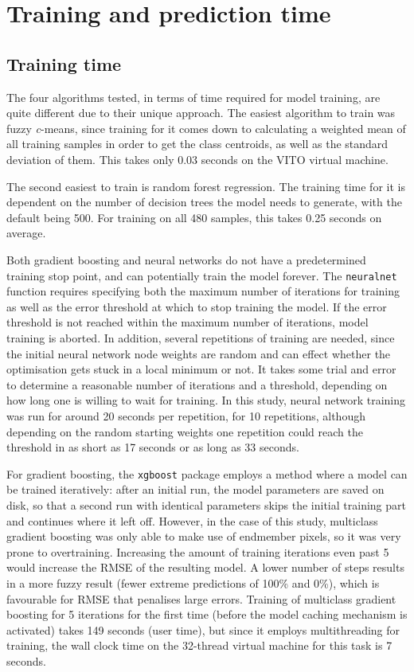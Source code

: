 \documentclass[a4paper,12pt]{scrbook}
\begin{document}
\section{Training and prediction time}

\subsection{Training time}

The four algorithms tested, in terms of time required for model training, are quite different due to their unique approach. The easiest algorithm to train was fuzzy \textit{c}-means, since training for it comes down to calculating a weighted mean of all training samples in order to get the class centroids, as well as the standard deviation of them. This takes only 0.03 seconds on the VITO virtual machine.

The second easiest to train is random forest regression. The training time for it is dependent on the number of decision trees the model needs to generate, with the default being 500. For training on all 480 samples, this takes 0.25 seconds on average.

Both gradient boosting and neural networks do not have a predetermined training stop point, and can potentially train the model forever. The \texttt{neuralnet} function requires specifying both the maximum number of iterations for training as well as the error threshold at which to stop training the model. If the error threshold is not reached within the maximum number of iterations, model training is aborted. In addition, several repetitions of training are needed, since the initial neural network node weights are random and can effect whether the optimisation gets stuck in a local minimum or not. It takes some trial and error to determine a reasonable number of iterations and a threshold, depending on how long one is willing to wait for training. In this study, neural network training was run for around 20 seconds per repetition, for 10 repetitions, although depending on the random starting weights one repetition could reach the threshold in as short as 17 seconds or as long as 33 seconds.

For gradient boosting, the \texttt{xgboost} package employs a method where a model can be trained iteratively: after an initial run, the model parameters are saved on disk, so that a second run with identical parameters skips the initial training part and continues where it left off. However, in the case of this study, multiclass gradient boosting was only able to make use of endmember pixels, so it was very prone to overtraining. Increasing the amount of training iterations even past 5 would increase the RMSE of the resulting model. A lower number of steps results in a more fuzzy result (fewer extreme predictions of 100\% and 0\%), which is favourable for RMSE that penalises large errors. Training of multiclass gradient boosting for 5 iterations for the first time (before the model caching mechanism is activated) takes 149 seconds (user time), but since it employs multithreading for training, the wall clock time on the 32-thread virtual machine for this task is 7 seconds.
\end{document}
